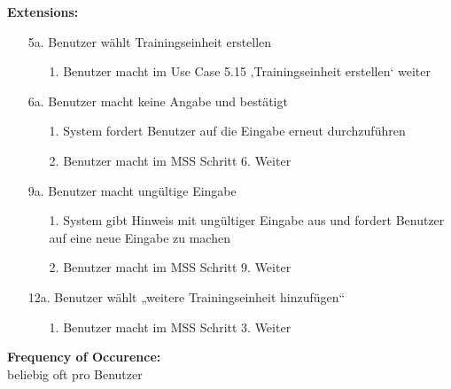 \documentclass[12pt,a4paper,onecolumn]{article}
\begin{document}
\textbf{Extensions:}
\begin{enumerate}
    \item [5a.]  Benutzer wählt \gls{Trainingseinheit} erstellen
    \begin{enumerate}
        \item[1.]Benutzer macht im Use Case 5.15 ‚\gls{Trainingseinheit} erstellen‘ weiter
    \end{enumerate}
    \item [6a.]Benutzer macht keine Angabe und bestätigt
    \begin{enumerate}
        \item[1.]System fordert Benutzer auf die Eingabe erneut durchzuführen
        \item[2.]Benutzer macht im MSS Schritt 6. Weiter
    \end{enumerate}
    \item[9a.] Benutzer macht ungültige Eingabe
    \begin{enumerate}
        \item [1.]System gibt Hinweis mit ungültiger Eingabe aus und fordert Benutzer auf eine neue Eingabe zu machen
        \item [2.]Benutzer macht im MSS Schritt 9. Weiter
    \end{enumerate}
    \item[12a.]Benutzer wählt „weitere \gls{Trainingseinheit} hinzufügen“
    \begin{enumerate}
        \item [1.]Benutzer macht im MSS Schritt 3. Weiter
    \end{enumerate}
\end{enumerate}
\textbf{Frequency of Occurence:}\\beliebig oft pro Benutzer  \\
\end{document}
